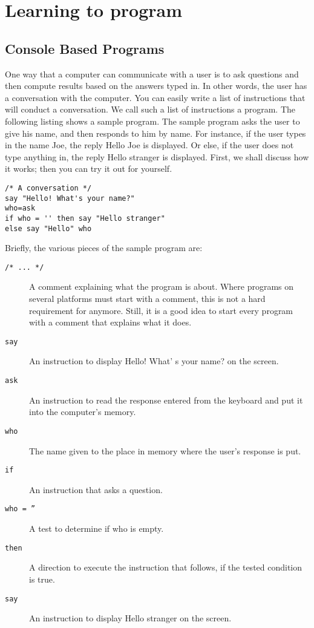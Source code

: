 {\chapter{Learning to program}
\section{Console Based Programs}
One way that a computer can communicate with a user is to ask
questions and then compute results based on the answers typed in. In
other words, the user has a conversation with the computer. You can
easily write a list of  \nr{} instructions that will conduct a conversation. We call such a list of instructions a program.
The following listing shows a sample \nr{} program. The sample program asks the user to give his name, and then responds to him by name. For instance, if the user types in the name Joe, the reply Hello Joe is displayed. Or else, if the user does not type anything in, the reply Hello stranger is displayed.
First, we shall discuss how it works; then you can try it out for
yourself.
\begin{lstlisting}[label=hello,caption=Hello Stranger]
/* A conversation */
say "Hello! What's your name?"
who=ask
if who = '' then say "Hello stranger"
else say "Hello" who
\end{lstlisting}
Briefly, the various pieces of the sample program are:
\begin{description}
\item[\texttt{/* ... */}] A comment explaining what the program is
  about. Where \Rexx{} programs on several platforms must start with a comment, this is not
  a hard requirement for \nr{} anymore. Still, it is a good idea to start
  every program with a comment that explains what it does.
\item [\texttt{say}] An instruction to display Hello! What' s your name? on the screen.
\item [\texttt{ask}] An instruction to read the response entered from the keyboard and put it into the computer's memory.
\item [\texttt{who}] The name given to the place in memory where the user's response is put.
\item [\texttt{if}] An instruction that asks a question. 
\item [\texttt{who = ''}] A test to determine if who is empty.
\item [\texttt{then}] A direction to execute the instruction that follows, if the tested condition is true.
\item [\texttt{say}] An instruction to display Hello stranger on the screen.

\end{description}}
